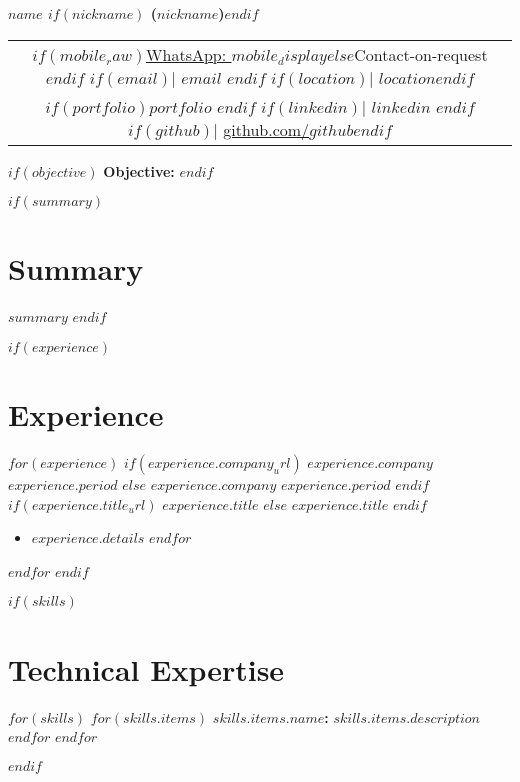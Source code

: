 \documentclass[10.5pt,a4paper]{article}
\newcommand{\daterange}[1]{\textbf{#1}}
\newcommand{\entryHeader}[2]{\noindent\textbf{#1} \hfill \daterange{#2}}
\newcommand{\entryHeaderLinked}[3]{\noindent\textbf{\href{#1}{#2}} \hfill \daterange{#3}}
\newcommand{\entrySubHeader}[1]{\textit{#1}}
\newcommand{\entrySubHeaderLinked}[2]{\textit{\href{#1}{#2}}}
\newenvironment{entryDetails}{%
  \begin{itemize}[leftmargin=*, itemsep=1pt, topsep=1pt, parsep=0pt]
}{%
  \end{itemize}
  \vspace{-0.1cm}
}
\begin{document}
\begin{center}
	{\LARGE \textbf{$name$ $if(nickname)$ ($nickname$)$endif$}}\\
	\begin{tabular}{@{}c@{}}
		$if(mobile_raw)$\href{https://wa.me/$country_code$$mobile_raw$}{WhatsApp: $mobile_display$}$else$Contact-on-request$endif$
		$if(email)$| \href{mailto:$email$}{$email$} $endif$
		$if(location)$| $location$$endif$                                                                      \\
		$if(portfolio)$\href{https://$portfolio$?utm_source=resume & utm_medium=document}{$portfolio$} $endif$
		$if(linkedin)$| \href{https://$linkedin$}{$linkedin$} $endif$
		$if(github)$| \href{https://github.com/$github$}{github.com/$github$}$endif$
	\end{tabular}
\end{center}

$if(objective)$
{\large\bfseries\color{sectioncolor}Objective:} 
\vspace{5pt}
$endif$

$if(summary)$
\section*{Summary}
$summary$
$endif$

$if(experience)$
\section*{Experience}
$for(experience)$
$if(experience.company_url)$
\entryHeaderLinked{$experience.company_url$}{$experience.company$}{$experience.period$}
$else$
\entryHeader{$experience.company$}{$experience.period$}
$endif$
\\
$if(experience.title_url)$
\entrySubHeaderLinked{$experience.title_url$}{$experience.title$}
$else$
\entrySubHeader{$experience.title$}
$endif$
\begin{entryDetails}
	$for(experience.details)$
	\item $experience.details$
	$endfor$
\end{entryDetails}
$endfor$
$endif$

$if(skills)$
\section*{Technical Expertise}
\begin{multicols}{2}
	$for(skills)$
	\vspace{3pt}
	$for(skills.items)$
	\noindent\textbf{$skills.items.name$:} $skills.items.description$\\[2pt]
	$endfor$
	\vspace{5pt}
	$endfor$
\end{multicols}
$endif$
\end{document}
